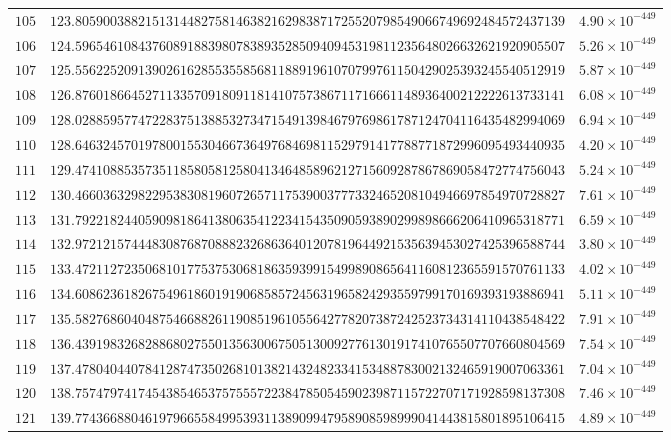 \documentclass[12pt,reqno]{amsart}
\theoremstyle{remark}
\begin{document}
\begin{longtable}{clc}
$105$ & $123.8059003882151314482758146382162983871725520798549066749692484572437139$ & $4.90\times 10^{-449}$ \\
$106$ & $124.5965461084376089188398078389352850940945319811235648026632621920905507$ & $5.26\times 10^{-449}$ \\
$107$ & $125.5562252091390261628553558568118891961070799761150429025393245540512919$ & $5.87\times 10^{-449}$ \\
$108$ & $126.8760186645271133570918091181410757386711716661148936400212222613733141$ & $6.08\times 10^{-449}$ \\
$109$ & $128.0288595774722837513885327347154913984679769861787124704116435482994069$ & $6.94\times 10^{-449}$ \\
$110$ & $128.6463245701978001553046673649768469811529791417788771872996095493440935$ & $4.20\times 10^{-449}$ \\
$111$ & $129.4741088535735118580581258041346485896212715609287867869058472774756043$ & $5.24\times 10^{-449}$ \\
$112$ & $130.4660363298229538308196072657117539003777332465208104946697854970728827$ & $7.61\times 10^{-449}$ \\
$113$ & $131.7922182440590981864138063541223415435090593890299898666206410965318771$ & $6.59\times 10^{-449}$ \\
$114$ & $132.9721215744483087687088823268636401207819644921535639453027425396588744$ & $3.80\times 10^{-449}$ \\
$115$ & $133.4721127235068101775375306818635939915499890865641160812365591570761133$ & $4.02\times 10^{-449}$ \\
$116$ & $134.6086236182675496186019190685857245631965824293559799170169393193886941$ & $5.11\times 10^{-449}$ \\
$117$ & $135.5827686040487546688261190851961055642778207387242523734314110438548422$ & $7.91\times 10^{-449}$ \\
$118$ & $136.4391983268288680275501356300675051300927761301917410765507707660804569$ & $7.54\times 10^{-449}$ \\
$119$ & $137.4780404407841287473502681013821432482334153488783002132465919007063361$ & $7.04\times 10^{-449}$ \\
$120$ & $138.7574797417454385465375755572238478505459023987115722707171928598137308$ & $7.46\times 10^{-449}$ \\
$121$ & $139.7743668804619796655849953931138909947958908598999041443815801895106415$ & $4.89\times 10^{-449}$ \\

\end{longtable}
\end{document}
